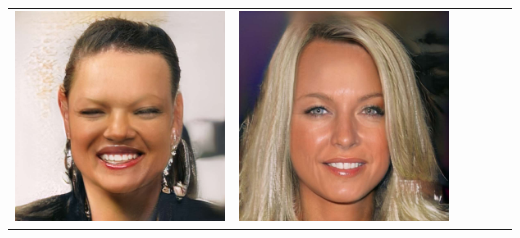 \documentclass[a0,landscape]{a0poster}
\begin{document}
\begin{multicols}{3}
\begin{center}
\begin{tabular}{cc|cc|cc}
\includegraphics[width=\pganw]{../figures/pgan/56_base_iso_MH.jpg} &
\includegraphics[width=\pganw]{../figures/pgan/57_base_iso_MH.jpg} \\

\end{tabular}
\end{center}
\end{multicols}
\end{document}
